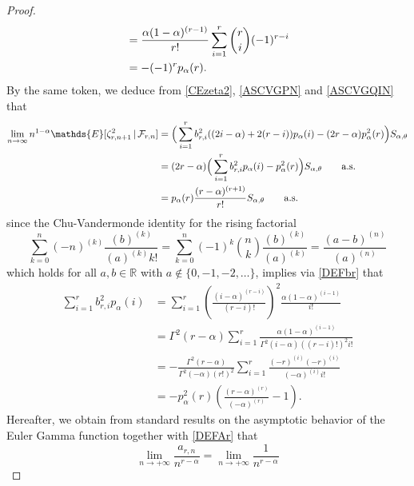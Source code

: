 \documentclass[twoside,12pt]{article}
\newcommand{\dR}{\mathbb{R}}
\newcommand{\E}{\mathds{E}}
\begin{document}
\begin{proof}
\begin{align}
&=\frac{\alpha(1-\alpha)^{(r-1)}}{r!} \sum_{i=1}^{r} \binom{r}{i} (-1)^{r-i} \notag \\
&=-(-1)^r  p_{\alpha}(r).
\label{BinomialBP}
\end{align}
By the same token, we deduce from \eqref{CEzeta2}, \eqref{ASCVGPN} and \eqref{ASCVGQIN} that 
\begin{align}
\label{ASCVGPCEzetar2}
\lim_{n \rightarrow \infty} n^{1-\alpha} \E[\zeta_{r,n+1}^2\,|\,\mathcal{F}_{r,n}]
&= \Big( \sum_{i=1}^{r}b_{r,i}^2 ((2i - \alpha)+2(r-i)) p_{\alpha}(i) - (2r-\alpha)p_{\alpha}^2(r) \Big)S_{\alpha, \theta} \notag \\  
&= (2r- \alpha) \Big( \sum_{i=1}^{r}b_{r,i}^2  p_{\alpha}(i) - p_{\alpha}^2(r) \Big)S_{\alpha, \theta} 
\qquad \text{a.s.} \notag \\  
&=  p_{\alpha}(r) 
\frac{(r-\alpha)^{(r+1)}}{r!} S_{\alpha, \theta}  \qquad \text{a.s.}
\end{align}
since the Chu-Vandermonde identity for the rising factorial
\begin{equation}
\label{ChuVan}
\sum_{k=0}^n (-n)^{(k)} \frac{(b)^{(k)}}{(a)^{(k)} k!}
= \sum_{k=0}^n (-1)^{k} \binom{n}{k} \frac{(b)^{(k)}}{(a)^{(k)}}= \frac{(a-b)^{(n)}}{(a)^{(n)}}
\end{equation}
which holds for all $a,b \in \dR$ with $a \notin \{0,-1,-2,\ldots\}$, implies via \eqref{DEFbr} that
\begin{align*}
\sum_{i=1}^{r}b_{r,i}^2  p_{\alpha}(i)&=\sum_{i=1}^{r}\left(\frac{(i-\alpha)^{(r-i)}}{(r-i)!}\right)^{2}\frac{\alpha(1-\alpha)^{(i-1)}}{i!}\\
&=\Gamma^2(r-\alpha)\sum_{i=1}^{r}\frac{\alpha(1-\alpha)^{(i-1)}}{\Gamma^2(i-\alpha)((r-i)!)^{2}i!}\\
&=-\frac{\Gamma^2(r-\alpha)}{\Gamma^2(-\alpha)(r!)^{2}}\sum_{i=1}^{r}\frac{(-r)^{(i)}(-r)^{(i)}}{(-\alpha)^{(i)}i!}\\
&=-p_\alpha^2(r)\left(\frac{(r-\alpha)^{(r)}}{(-\alpha)^{(r)}}-1\right).
\end{align*}
Hereafter, we obtain from standard results on the asymptotic behavior of
the Euler Gamma function together with \eqref{DEFAr} that
\begin{equation}
\label{CVGANr}
\lim_{n\rightarrow+\infty} \frac{a_{r,n}}{n^{r-\alpha}}=\lim_{n\rightarrow+\infty}\frac{1}{n^{r-\alpha}}

\end{equation}
\end{proof}
\end{document}

